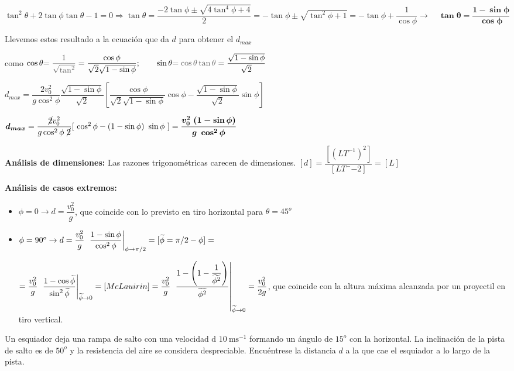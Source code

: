 $\tan^2 \theta +2\tan\phi \tan \theta -1 =0 \Rightarrow \tan \theta= \dfrac {-2\tan \phi \pm \sqrt{4\tan^4 \phi+4}}{2}=-\tan \phi \pm \sqrt{\tan^2 \phi + 1}=-\tan \phi + \dfrac{1}{\cos \phi} \to \quad \boldsymbol { \tan \theta = \dfrac {1-\sin \phi}{\cos \phi} }$


Llevemos estos resultado a la ecuación que da $d$ para obtener el $d_{max}$

como $\cos \theta \textcolor{gris}{= \dfrac 1 {\sqrt{\tan^2}}} =\dfrac {\cos \phi}{\sqrt{2} \sqrt{1-\sin \phi}}; \qquad \sin \theta \textcolor{gris}{=\cos \theta \tan \theta}=\dfrac{\sqrt{1-\sin \phi}}{\sqrt{2}}$

$ d_{max}  =\dfrac {2 v_0^2}{g \cos^2 \phi} \dfrac {\sqrt{1-\sin \phi}}{\sqrt{2}} \left[
\dfrac {\cos \phi}{\sqrt{2}\sqrt{1-\sin \phi}}\cos \phi - \dfrac{\sqrt{1-\sin \phi}}{\sqrt{2}}\sin \phi
\right] $ 

$\boldsymbol{d_{max}} =\dfrac{\cancel{2} v_0^2}{g \cos^2 \phi \ \cancel{2}}[ \ \cos^2 \phi - (1-\sin \phi)\ \sin \phi  \ ]  = \boldsymbol{\dfrac {v_0^2 \ (1-\sin \phi)}{g \ \cos^2 \phi}}$

\vspace{4mm} \textbf{Análisis de dimensiones:} Las razones trigonométricas carecen de dimensiones. $[d]=\dfrac{[(LT^{-1})^2]}{[LT^-{-2}]}=[L]$

\vspace{4mm} \textbf{Análisis de casos extremos:}
\begin{itemize}
\item $\phi=0 \to d=\dfrac {v_0^2} {g}$, que coincide con lo previsto en tiro horizontal para $\theta=45^o$
\item$\phi=90^o \to d= \dfrac {v_0^2}{g}\ \eval{\dfrac {1-\sin \phi}{\cos^2 \phi}}_{\phi\to \pi/2}= [ \widetilde{\phi} =\pi/2 - \phi]=$ 

$= \dfrac {v_0^2}{g}\ \eval{\dfrac {1-\cos \widetilde{\phi}}{\sin^2 \widetilde{\phi}}}_{\widetilde{\phi}\to 0}=[McLauirin]= \dfrac {v_0^2} {g} \eval{\ \dfrac {1-\left( 1-\dfrac {1}{\widetilde{\phi^2}} \right)} {\widetilde{\phi^2}}}_{\widetilde{\phi}\to 0} =\dfrac {v_0^2}{2g}$, que coincide con la altura máxima alcanzada por un proyectil en tiro vertical.
\end{itemize}

\begin{prob}
Un esquiador deja una rampa de salto con una velocidad d $10 \ \mathrm{ms}^{-1}$	formando un ángulo de $15^o$ con la horizontal. La inclinación de la pista de salto es de $50^o$ y la resistencia del aire se considera despreciable. Encuéntrese la distancia $d$ a la que cae el esquiador a lo largo de la pista.
\end{prob}

